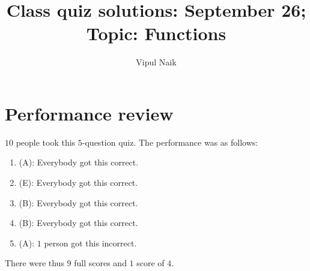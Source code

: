 \documentclass[10pt]{amsart}
\title{Class quiz solutions: September 26; Topic: Functions}
\author{Vipul Naik}
\begin{document}
\maketitle

\section{Performance review}

$10$ people took this $5$-question quiz. The performance was as
follows:

\begin{enumerate}

\item (A): Everybody got this correct.
\item (E): Everybody got this correct.
\item (B): Everybody got this correct.
\item (B): Everybody got this correct.
\item (A): $1$ person got this incorrect.
\end{enumerate}

There were thus $9$ full scores and $1$ score of $4$.
\end{document}
